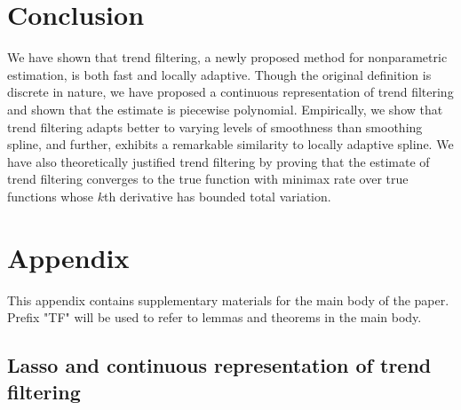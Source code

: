 \documentclass[a4paper]{article}
\begin{document}
\section{Conclusion}
\label{sec:conclusion}
We have shown that trend filtering, a newly proposed method for nonparametric estimation, is both fast and locally adaptive. Though the original definition is discrete in nature, we have proposed a continuous representation of trend filtering and shown that the estimate is piecewise polynomial. Empirically, we show that trend filtering adapts better to varying levels of smoothness than smoothing spline, and further, exhibits a remarkable similarity to locally adaptive spline. We have also theoretically justified trend filtering by proving that the estimate of trend filtering converges to the true function with minimax rate over true functions whose $k$th derivative has bounded total variation.



\appendix
\section*{Appendix}
\renewcommand{\thesubsection}{\Alph{subsection}}
This appendix contains supplementary materials for the main body of the paper. Prefix "TF" will be used to refer to lemmas and theorems in the main body.

\subsection{Lasso and continuous representation of trend filtering}
\end{document}
